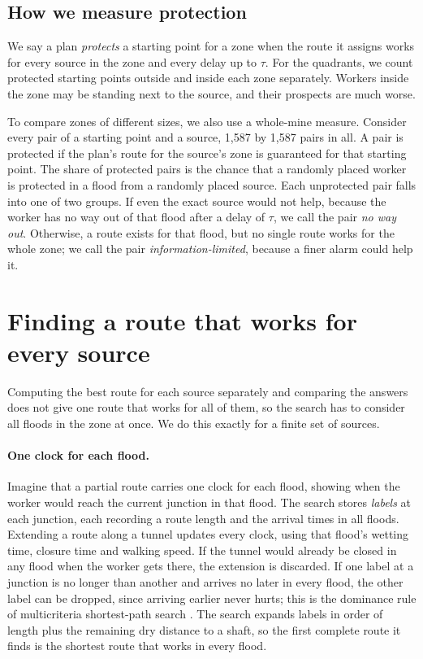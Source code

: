 \subsection{How we measure protection}
We say a plan \emph{protects} a starting point for a zone when the route it assigns works for every source in the zone and every delay up to $\tau$. For the quadrants, we count protected starting points outside and inside each zone separately. Workers inside the zone may be standing next to the source, and their prospects are much worse.

To compare zones of different sizes, we also use a whole-mine measure. Consider every pair of a starting point and a source, 1,587 by 1,587 pairs in all. A pair is protected if the plan's route for the source's zone is guaranteed for that starting point. The share of protected pairs is the chance that a randomly placed worker is protected in a flood from a randomly placed source. Each unprotected pair falls into one of two groups. If even the exact source would not help, because the worker has no way out of that flood after a delay of $\tau$, we call the pair \emph{no way out}. Otherwise, a route exists for that flood, but no single route works for the whole zone; we call the pair \emph{information-limited}, because a finer alarm could help it.

\section{Finding a route that works for every source}\label{sec:compute}
Computing the best route for each source separately and comparing the answers does not give one route that works for all of them, so the search has to consider all floods in the zone at once. We do this exactly for a finite set of sources.

\paragraph{One clock for each flood.}
Imagine that a partial route carries one clock for each flood, showing when the worker would reach the current junction in that flood. The search stores \emph{labels} at each junction, each recording a route length and the arrival times in all floods. Extending a route along a tunnel updates every clock, using that flood's wetting time, closure time and walking speed. If the tunnel would already be closed in any flood when the worker gets there, the extension is discarded. If one label at a junction is no longer than another and arrives no later in every flood, the other label can be dropped, since arriving earlier never hurts; this is the dominance rule of multicriteria shortest-path search \cite{martins1984,hamacher2006}. The search expands labels in order of length plus the remaining dry distance to a shaft, so the first complete route it finds is the shortest route that works in every flood.

